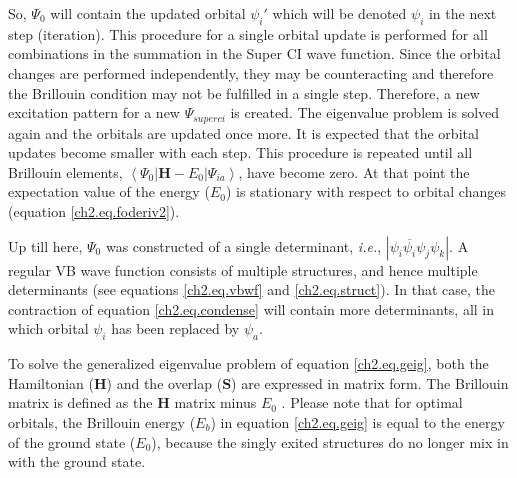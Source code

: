 So, $\Psi_0$ will contain the updated orbital $\psi_i'$ which will be denoted $\psi_i$ in the next step (iteration). This procedure for a single orbital update is performed for all combinations in the summation in the Super CI wave function. Since the orbital changes are performed independently, they may be counteracting and therefore the Brillouin condition may not be fulfilled in a single step. Therefore, a new excitation pattern for a new $\Psi_{superci}$ is created. The eigenvalue problem is solved again and the orbitals are updated once more. It is expected that the orbital updates become smaller with each step. This procedure is repeated until all Brillouin elements, $\left < \Psi_0 | \mathbf{H} - E_0 | \Psi_{ia} \right >$, have become zero. At that point the expectation value of the energy ($E_0$) is stationary with respect to orbital changes (equation \ref{ch2.eq.foderiv2}).

Up till here, $\Psi_0$ was constructed of a single determinant, \textit{i.e.}, $|\psi_i\overline{\psi_i}\psi_j\psi_k|$. A regular VB wave function consists of multiple structures, and hence multiple determinants (see equations \ref{ch2.eq.vbwf} and \ref{ch2.eq.struct}). In that case, the contraction of equation \ref{ch2.eq.condense} will contain more determinants, all in which orbital $\psi_i$ has been replaced by $\psi_a$.

To solve the generalized eigenvalue problem of equation \ref{ch2.eq.geig}, both the Hamiltonian ($\mathbf{H}$) and the overlap ($\mathbf{S}$) are expressed in matrix form.  The Brillouin matrix is defined as the $\mathbf{H}$ matrix minus $E_0$ \cite{koos1}. Please note that for optimal orbitals, the Brillouin energy ($E_b$) in equation \ref{ch2.eq.geig} is equal to the energy of the ground state ($E_0$), because the singly exited structures do no longer mix in with the ground state. 

